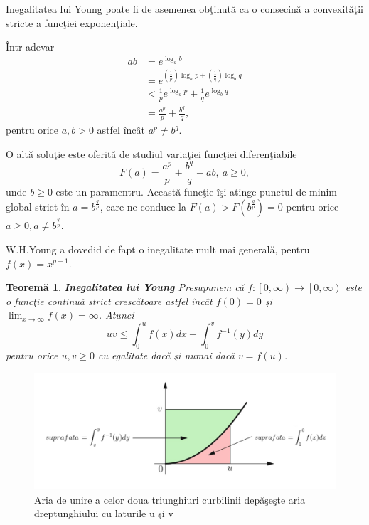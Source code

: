 \documentclass[a4paper,12pt,oneside]{report}
\newtheorem{theorem}{Teorem\u a}
\begin{document}
Inegalitatea lui Young poate fi de asemenea ob\c{t}inut\u{a} ca o consecin\u{a} a convexit\u{a}\c{t}ii stricte a func\c{t}iei exponen\c{t}iale.

\^{I}ntr-adevar
\begin{equation} \nonumber
    \begin{split}
        ab & =  e^{\log_{a}b} \\ & = e^{\left (\frac{1}{p}  \right )\log_{a}p+ \left ( \frac{1}{q} \right )\log_{b}q} \\ & < \frac{1}{p}e^{\log_{a}p}+\frac{1}{q}e^{\log_{b}q} \\ & = \frac{a^{p}}{p}+\frac{b^{q}}{q},
    \end{split}
\end{equation}
pentru orice \(a,b>0\) astfel \^{i}nc\^{a}t \(a^{p}\neq b^{q}\).

O alt\u{a} solu\c{t}ie este oferit\u{a} de studiul varia\c{t}iei func\c{t}iei diferen\c{t}iabile
\begin{displaymath}
  F\left ( a \right )= \frac{a^{p}}{p}+\frac{b^{q}}{q} - ab,~ a\geq 0,
\end{displaymath}
unde \(b\geq 0\) este un paramentru. Aceast\u{a} func\c{t}ie \^{i}\c{s}i atinge punctul de minim global strict \^{i}n \(a= b^{\frac{q}{p}}\), care ne conduce la \(F\left ( a \right )> F\left ( b^{\frac{q}{p}} \right ) = 0\) pentru orice \(a\geq 0, a\neq b^{\frac{q}{p}}\).

  W.H.Young a dovedid de fapt  o inegalitate mult mai general\u{a}, pentru \(f\left ( x \right )=  x^{p-1}\).

\begin{theorem}
\textbf{Inegalitatea lui Young
}
Presupunem c\u{a} \(f: \left [ 0,\infty  \right ) \rightarrow \left [ 0,\infty  \right )\) este o func\c{t}ie continu\u{a} strict cresc\u{a}toare astfel \^{i}nc\^{a}t \(f\left ( 0 \right )= 0\) \c{s}i \(\lim_{x\rightarrow \infty }f\left ( x \right )= \infty\). Atunci
\begin{displaymath}
  uv\leq \int_{0}^{u}f\left ( x \right )dx + \int_{0}^{v}f^{-1}\left ( y \right )dy
\end{displaymath}
pentru orice \(u,v\geq 0\) cu egalitate dac\u{a} \c{s}i numai dac\u{a} \( v = f\left ( u \right )\).
\end{theorem}

\begin{figure}[htbp]
	\centering
	\includegraphics[width=1.0\textwidth]{ fig1.2.png}
	\caption{ Aria  de unire a celor doua triunghiuri curbilinii dep\u{a}\c{s}e\c{s}te aria dreptunghiului cu laturile u \c{s}i v}
\end{figure}
\end{document}
